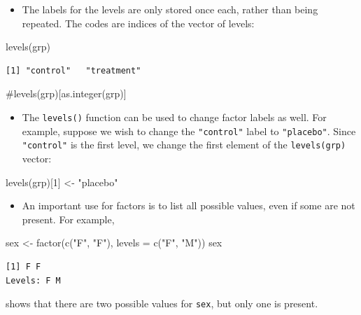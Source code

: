 \documentclass[
  9pt,
  a4paper,
  ignorenonframetext,
  notheorems]{beamer}
\newenvironment{Shaded}{\begin{snugshade}}{\end{snugshade}}
\newcommand{\AttributeTok}[1]{\textcolor[rgb]{0.40,0.45,0.13}{#1}}
\newcommand{\CommentTok}[1]{\textcolor[rgb]{0.37,0.37,0.37}{#1}}
\newcommand{\DecValTok}[1]{\textcolor[rgb]{0.68,0.00,0.00}{#1}}
\newcommand{\FunctionTok}[1]{\textcolor[rgb]{0.28,0.35,0.67}{#1}}
\newcommand{\NormalTok}[1]{\textcolor[rgb]{0.00,0.23,0.31}{#1}}
\newcommand{\OtherTok}[1]{\textcolor[rgb]{0.00,0.23,0.31}{#1}}
\newcommand{\StringTok}[1]{\textcolor[rgb]{0.13,0.47,0.30}{#1}}
\providecommand{\tightlist}{%
  \setlength{\itemsep}{0pt}\setlength{\parskip}{0pt}}\usepackage{longtable,booktabs,array}
\begin{document}
\begin{frame}[fragile]
\begin{itemize}
\tightlist
\item
  The labels for the levels are only stored once each, rather than being
  repeated. The codes are indices of the vector of levels:
\end{itemize}

\begin{Shaded}
\begin{Highlighting}[]
\FunctionTok{levels}\NormalTok{(grp)}
\end{Highlighting}
\end{Shaded}

\begin{verbatim}
[1] "control"   "treatment"
\end{verbatim}

\begin{Shaded}
\begin{Highlighting}[]
\CommentTok{\#levels(grp)[as.integer(grp)]}
\end{Highlighting}
\end{Shaded}

\begin{itemize}
\tightlist
\item
  The \texttt{levels()} function can be used to change factor labels as
  well. For example, suppose we wish to change the \texttt{"control"}
  label to \texttt{"placebo"}. Since \texttt{"control"} is the first
  level, we change the first element of the \texttt{levels(grp)} vector:
\end{itemize}

\begin{Shaded}
\begin{Highlighting}[]
\FunctionTok{levels}\NormalTok{(grp)[}\DecValTok{1}\NormalTok{] }\OtherTok{\textless{}{-}} \StringTok{"placebo"}
\end{Highlighting}
\end{Shaded}

\begin{itemize}
\tightlist
\item
  An important use for factors is to list all possible values, even if
  some are not present. For example,
\end{itemize}

\begin{Shaded}
\begin{Highlighting}[]
\NormalTok{sex }\OtherTok{\textless{}{-}} \FunctionTok{factor}\NormalTok{(}\FunctionTok{c}\NormalTok{(}\StringTok{"F"}\NormalTok{, }\StringTok{"F"}\NormalTok{), }\AttributeTok{levels =} \FunctionTok{c}\NormalTok{(}\StringTok{"F"}\NormalTok{, }\StringTok{"M"}\NormalTok{)) }
\NormalTok{sex}
\end{Highlighting}
\end{Shaded}

\begin{verbatim}
[1] F F
Levels: F M
\end{verbatim}

shows that there are two possible values for \texttt{sex}, but only one
is present.
\end{frame}
\end{document}
